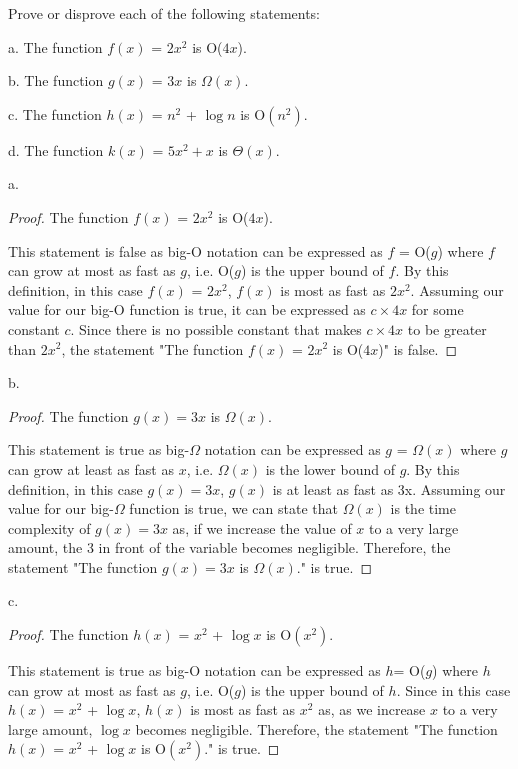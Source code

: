 \documentclass{article}
\begin{document}
\clearpage
\header
\item[]Prove or disprove each of the following statements:
\item[]a. The function $f(x)$ = $2x^{2}$ is O($4x$).
\item[]b. The function $g(x)$ = $3x$ is $\Omega(x).$
\item[]c. The function $h(x)$ = $n^{2}$ + $\log n$ is O$(n^{2})$.
\item[]d. The function $k(x)$ = $5x^{2} + x$ is $\Theta(x)$.
\item[]a. 
    \begin{proof}
        \caption{The function $f(x)$ = $2x^{2}$ is O($4x$).}
            \item[]This statement is false as big-O notation can be expressed as $f$ = O($g$) where $f$ can grow at most as fast as $g$, i.e. O($g$) is the upper bound of $f$. By this definition, in this case $f(x)$ = $2x^{2}$, $f(x)$ is most as fast as $2x^{2}$. Assuming our value for our big-O function is true, it can be expressed as $c\times 4x$ for some constant $c$. Since there is no possible constant that makes $c\times 4x$ to be greater than $2x^{2}$, the statement "The function $f(x)$ = $2x^{2}$ is O($4x$)" is false.
    \end{proof}
\item[]b. 
    \begin{proof}
        \caption{The function $g(x) = 3x$ is $\Omega(x).$}
            \item[]This statement is true as big-$\Omega$ notation can be expressed as $g$ = $\Omega(x)$ where $g$ can grow at least as fast as $x$, i.e. $\Omega(x)$ is the lower bound of $g$. By this definition, in this case $g(x) = 3x$, $g(x)$ is at least as fast as 3x. Assuming our value for our big-$\Omega$ function is true, we can state that $\Omega(x)$ is the time complexity of $g(x) = 3x$ as, if we increase the value of $x$ to a very large amount, the 3 in front of the variable becomes negligible. Therefore, the statement "The function $g(x) = 3x$ is $\Omega(x).$" is true.
    \end{proof}
\item[]c. 
    \begin{proof}
        \caption{The function $h(x)$ = $x^{2}$ + $\log x$ is O$(x^{2})$.}
            \item[]This statement is true as big-O notation can be expressed as $h$= O($g$) where $h$ can grow at most as fast as $g$, i.e. O($g$) is the upper bound of $h$. Since in this case $h(x)$ = $x^{2}$ + $\log x$, $h(x)$ is most as fast as $x^{2}$ as, as we increase $x$ to a very large amount, $\log x$ becomes negligible. Therefore, the statement "The function $h(x)$ = $x^{2}$ + $\log x$ is O$(x^{2})$." is true.
    \end{proof}    
\end{document}
